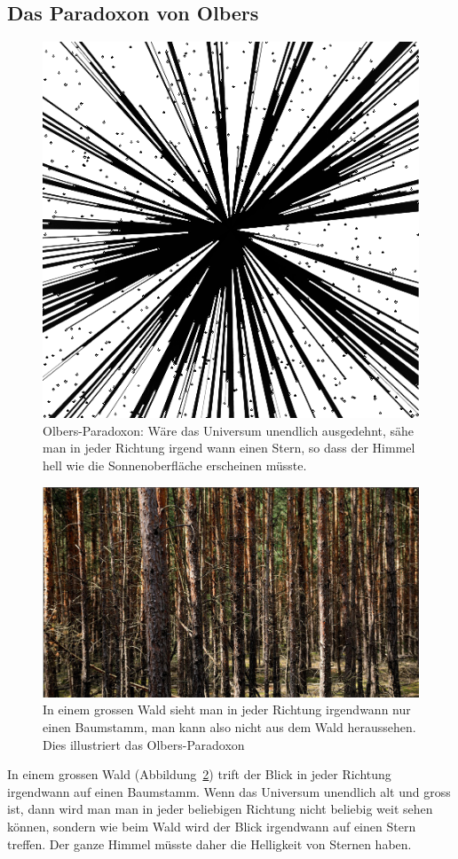 \subsection{Das Paradoxon von Olbers}
\begin{figure}
\centering
\includegraphics[width=\hsize]{chapters/tikz/wald.pdf}
\caption{Olbers-Paradoxon: Wäre das Universum unendlich ausgedehnt,
sähe man in jeder Richtung irgend wann einen Stern, so dass der Himmel
hell wie die Sonnenoberfläche erscheinen müsste.
\label{skript:figure:waldolbers}}
\end{figure}
\begin{figure}
\centering
\includegraphics[width=\hsize]{chapters/images/wald50.jpg}
\caption{In einem grossen Wald sieht man in jeder Richtung irgendwann
nur einen Baumstamm, man kann also nicht aus dem Wald heraussehen.
Dies illustriert das Olbers-Paradoxon
\label{skript:robertson:olberswald}}
\end{figure}
In einem grossen Wald (Abbildung~\ref{skript:robertson:olberswald})
trift der Blick in jeder Richtung irgendwann auf einen Baumstamm.
Wenn das Universum unendlich alt und gross ist, dann wird man
man in jeder beliebigen Richtung nicht beliebig weit sehen können,
sondern wie beim Wald wird der Blick irgendwann auf einen Stern treffen.
Der ganze Himmel müsste daher die Helligkeit von Sternen haben.

